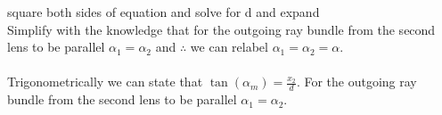 \documentclass[main.tex]{subfiles}
\begin{document}
square both sides of equation and solve for d and expand \\

Simplify with the knowledge that for the outgoing ray bundle from the second lens to be parallel $\alpha_1 = \alpha_2$ and $\therefore$ we can relabel $\alpha_1 = \alpha_2 =\alpha$.\\

\\ Trigonometrically we can state that $\tan(\alpha_m) = \frac{x_2}{d}$. For the outgoing ray bundle from the second lens to be parallel $\alpha_1 = \alpha_2$.\\






\end{document}
